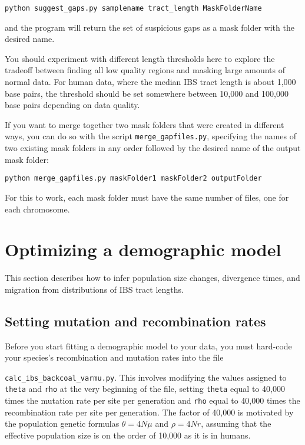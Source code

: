 \documentclass[12pt]{article}
\begin{document}
{\begin{verbatim}
python suggest_gaps.py samplename tract_length MaskFolderName
\end{verbatim}

and the program will return the set of suspicious gaps as a mask folder with the desired name. 

You should experiment with different length thresholds here to explore the tradeoff between finding all low quality regions and masking large amounts of normal data. For human data, where the median IBS tract length is about 1,000 base pairs, the threshold should be set somewhere between 10,000 and 100,000 base pairs depending on data quality. 

}

If you want to merge together two mask folders that were created in different ways, you can do so with the script \verb|merge_gapfiles.py|, specifying the names of two existing mask folders in any order followed by the desired name of the output mask folder:

\begin{verbatim}
python merge_gapfiles.py maskFolder1 maskFolder2 outputFolder
\end{verbatim}


For this to work, each mask folder must have the same number of files, one for each chromosome.

\section{Optimizing a demographic model}
This section describes how to infer population size changes, divergence times, and migration from distributions of IBS tract lengths.


\subsection{Setting mutation and recombination rates}
Before you start fitting a demographic model to your data, you must hard-code your species's recombination and mutation rates into the file 

\noindent \verb|calc_ibs_backcoal_varmu.py|. This involves modifying the values assigned to \texttt{theta} and \texttt{rho} at the very beginning of the file, setting \texttt{theta} equal to 40,000 times the mutation rate per site per generation and \texttt{rho} equal to 40,000 times the recombination rate per site per generation. The factor of 40,000 is motivated by the population genetic formulas $\theta=4N\mu$ and $\rho=4Nr$, assuming that the effective population size is on the order of 10,000 as it is in humans. 
\end{document}
